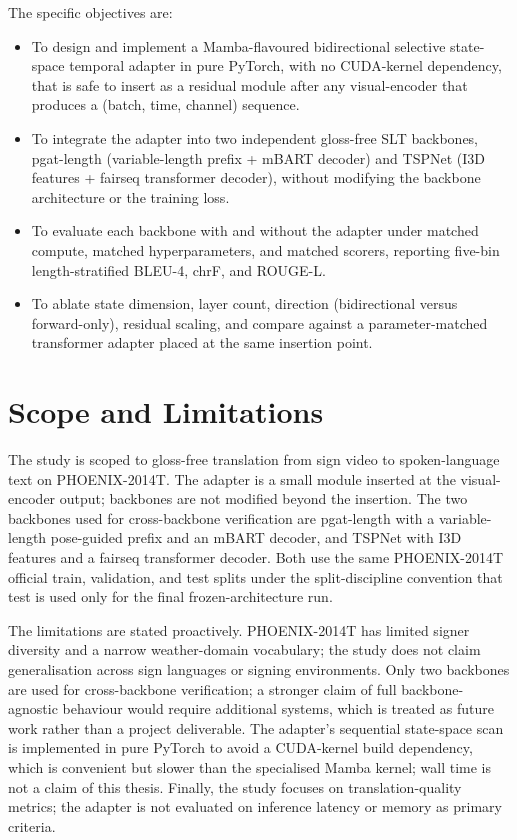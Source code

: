 The specific objectives are:
\begin{itemize}
    \item To design and implement a Mamba-flavoured bidirectional selective state-space temporal adapter in pure PyTorch, with no CUDA-kernel dependency, that is safe to insert as a residual module after any visual-encoder that produces a (batch, time, channel) sequence.
    \item To integrate the adapter into two independent gloss-free SLT backbones, pgat-length (variable-length prefix + mBART decoder) and TSPNet (I3D features + fairseq transformer decoder), without modifying the backbone architecture or the training loss.
    \item To evaluate each backbone with and without the adapter under matched compute, matched hyperparameters, and matched scorers, reporting five-bin length-stratified BLEU-4, chrF, and ROUGE-L.
    \item To ablate state dimension, layer count, direction (bidirectional versus forward-only), residual scaling, and compare against a parameter-matched transformer adapter placed at the same insertion point.
\end{itemize}

\section{Scope and Limitations}

The study is scoped to gloss-free translation from sign video to spoken-language text on PHOENIX-2014T. The adapter is a small module inserted at the visual-encoder output; backbones are not modified beyond the insertion. The two backbones used for cross-backbone verification are pgat-length with a variable-length pose-guided prefix and an mBART decoder, and TSPNet with I3D features and a fairseq transformer decoder. Both use the same PHOENIX-2014T official train, validation, and test splits under the split-discipline convention that test is used only for the final frozen-architecture run.

The limitations are stated proactively. PHOENIX-2014T has limited signer diversity and a narrow weather-domain vocabulary; the study does not claim generalisation across sign languages or signing environments. Only two backbones are used for cross-backbone verification; a stronger claim of full backbone-agnostic behaviour would require additional systems, which is treated as future work rather than a project deliverable. The adapter's sequential state-space scan is implemented in pure PyTorch to avoid a CUDA-kernel build dependency, which is convenient but slower than the specialised Mamba kernel; wall time is not a claim of this thesis. Finally, the study focuses on translation-quality metrics; the adapter is not evaluated on inference latency or memory as primary criteria.

